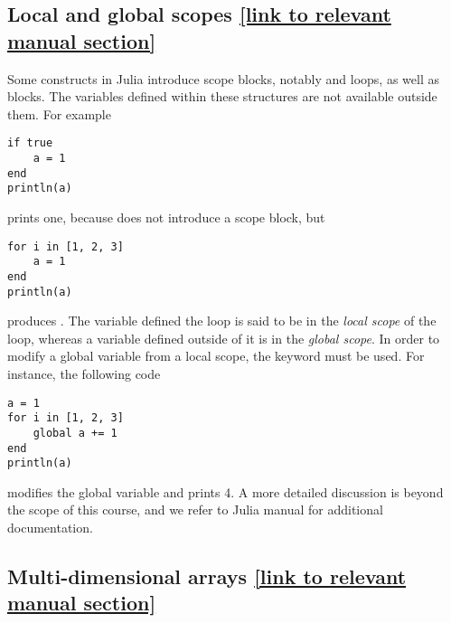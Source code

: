 \subsection*{Local and global scopes {\footnotesize \href{https://docs.julialang.org/en/v1/manual/variables-and-scoping/}{[link to relevant manual section]}}}
Some constructs in Julia introduce scope blocks, notably  and  loops,
as well as  blocks.
The variables defined within these structures are not available outside them.
For example
\begin{verbatim}
if true
    a = 1
end
println(a)
\end{verbatim}
prints one,
because  does not introduce a scope block,
but
\begin{verbatim}
for i in [1, 2, 3]
    a = 1
end
println(a)
\end{verbatim}
produces .
The variable  defined the  loop is said to be in the \emph{local scope} of the loop,
whereas a variable defined outside of it is in the \emph{global scope}.
In order to modify a global variable from a local scope,
the  keyword must be used.
For instance, the following code
\begin{verbatim}
a = 1
for i in [1, 2, 3]
    global a += 1
end
println(a)
\end{verbatim}
modifies the global variable  and prints 4.
A more detailed discussion is beyond the scope of this course,
and we refer to Julia manual for additional documentation.

\subsection*{Multi-dimensional arrays {\footnotesize \href{https://docs.julialang.org/en/v1/manual/arrays/} {[link to relevant manual section]}}}%
\label{sub:multi_dimensional_arrays}

